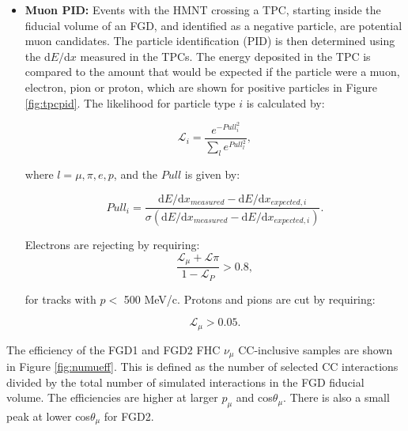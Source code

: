 \begin{itemize}
\item \textbf{Muon PID:} Events with the HMNT crossing a TPC, starting inside the fiducial volume of an FGD, and identified as a negative particle, are potential muon candidates. The particle identification (PID) is then determined using the d$E/$d$x$ measured in the TPCs. The energy deposited in the TPC is compared to the amount that would be expected if the particle were a muon, electron, pion or proton, which are shown for positive particles in Figure \ref{fig:tpcpid}. The likelihood for particle type $i$ is calculated by:

\begin{equation}
\mathcal{L}_{i} = \frac{e^{-Pull_{i}^{2}}}{\sum_{l}e^{Pull_{l}^2}},
\end{equation}

where $l = \mu, \pi, e, p$, and the $Pull$ is given by:

\begin{equation}
Pull_{i} = \frac{\text{d}E/\text{d}x_{measured} - \text{d}E/\text{d}x_{expected,i}}{\sigma(\text{d}E/\text{d}x_{measured}-\text{d}E/\text{d}x_{expected,i})}.
\end{equation}

Electrons are rejecting by requiring:
\begin{equation}
\frac{\mathcal{L}_{\mu}+\mathcal{L}{\pi}}{1-\mathcal{L}_P} > 0.8,
\end{equation}

for tracks with $p < $ 500 MeV/c. Protons and pions are cut by requiring:

\begin{equation}
\mathcal{L}_{\mu} > 0.05.
\end{equation}
\end{itemize}

The efficiency of the FGD1 and FGD2 FHC $\nu_{\mu}$ CC-inclusive samples are shown in Figure \ref{fig:numueff}. This is defined as the number of selected CC interactions divided by the total number of simulated interactions in the FGD fiducial volume. The efficiencies are higher at larger $p_{\mu}$ and cos$\theta_{\mu}$. There is also a small peak at lower cos$\theta_{\mu}$ for FGD2.

